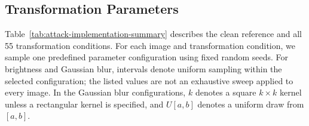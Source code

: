 \subsection{Transformation Parameters}
\label{app:transformation-parameters}

Table~\ref{tab:attack-implementation-summary} describes the clean reference and all 55 transformation conditions.
For each image and transformation condition, we sample one predefined parameter configuration using fixed random seeds.
For brightness and Gaussian blur, intervals denote uniform sampling within the selected configuration; the listed values are not an exhaustive sweep applied to every image.
In the Gaussian blur configurations, \(k\) denotes a square \(k\times k\) kernel unless a rectangular kernel is specified, and \(U[a,b]\) denotes a uniform draw from \([a,b]\).


